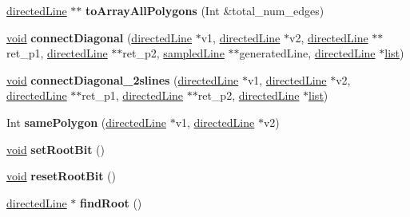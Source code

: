\begin{DoxyCompactItemize}
\item 
\mbox{\label{classdirected_line_ab6f64ceb89f11bf7f02a1d48b5baa6c8}} 
\hyperlink{classdirected_line}{directed\+Line} $\ast$$\ast$ {\bfseries to\+Array\+All\+Polygons} (Int \&total\+\_\+num\+\_\+edges)
\item 
\mbox{\label{classdirected_line_a6122e8463e0a62b47e23a094a6aa4bb2}} 
\hyperlink{interfacevoid}{void} {\bfseries connect\+Diagonal} (\hyperlink{classdirected_line}{directed\+Line} $\ast$v1, \hyperlink{classdirected_line}{directed\+Line} $\ast$v2, \hyperlink{classdirected_line}{directed\+Line} $\ast$$\ast$ret\+\_\+p1, \hyperlink{classdirected_line}{directed\+Line} $\ast$$\ast$ret\+\_\+p2, \hyperlink{classsampled_line}{sampled\+Line} $\ast$$\ast$generated\+Line, \hyperlink{classdirected_line}{directed\+Line} $\ast$\hyperlink{classlist}{list})
\item 
\mbox{\label{classdirected_line_aaf937a03788bd9c291f814112a9ed4f2}} 
\hyperlink{interfacevoid}{void} {\bfseries connect\+Diagonal\+\_\+2slines} (\hyperlink{classdirected_line}{directed\+Line} $\ast$v1, \hyperlink{classdirected_line}{directed\+Line} $\ast$v2, \hyperlink{classdirected_line}{directed\+Line} $\ast$$\ast$ret\+\_\+p1, \hyperlink{classdirected_line}{directed\+Line} $\ast$$\ast$ret\+\_\+p2, \hyperlink{classdirected_line}{directed\+Line} $\ast$\hyperlink{classlist}{list})
\item 
\mbox{\label{classdirected_line_a9370e664f24e664c3afbaad01b2fbbd0}} 
Int {\bfseries same\+Polygon} (\hyperlink{classdirected_line}{directed\+Line} $\ast$v1, \hyperlink{classdirected_line}{directed\+Line} $\ast$v2)
\item 
\mbox{\label{classdirected_line_ac55e2be24984fa5083ca79839aa794ad}} 
\hyperlink{interfacevoid}{void} {\bfseries set\+Root\+Bit} ()
\item 
\mbox{\label{classdirected_line_a5266cb2f624d777edf58ddf67d99a0c1}} 
\hyperlink{interfacevoid}{void} {\bfseries reset\+Root\+Bit} ()
\item 
\mbox{\label{classdirected_line_a6ccfd3dd98dc22c69b246e45e8987ad3}} 
\hyperlink{classdirected_line}{directed\+Line} $\ast$ {\bfseries find\+Root} ()

\end{DoxyCompactItemize}
